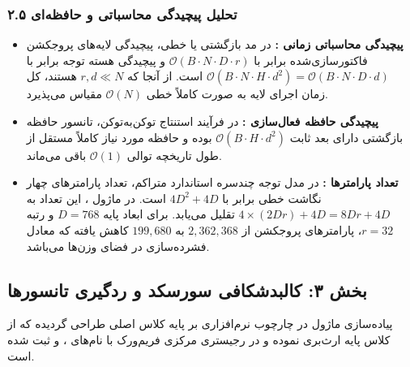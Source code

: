 \subsubsection*{۲.۵ تحلیل پیچیدگی محاسباتی و حافظه‌ای}
\begin{itemize}
    \item \textbf{پیچیدگی محاسباتی زمانی :} در مد بازگشتی یا خطی، پیچیدگی لایه‌های پروجکشن فاکتورسازی‌شده برابر با $\mathcal{O}(B \cdot N \cdot D \cdot r)$ و پیچیدگی هسته توجه برابر با $\mathcal{O}(B \cdot N \cdot H \cdot d^2) = \mathcal{O}(B \cdot N \cdot D \cdot d)$ است. از آنجا که $r, d \ll N$ هستند، کل زمان اجرای لایه به صورت کاملاً خطی $\mathcal{O}(N)$ مقیاس می‌پذیرد.
    \item \textbf{پیچیدگی حافظه فعال‌سازی :} در فرآیند استنتاج توکن‌به‌توکن، تانسور حافظه بازگشتی دارای بعد ثابت $\mathcal{O}(B \cdot H \cdot d^2)$ بوده و حافظه مورد نیاز کاملاً مستقل از طول تاریخچه توالی $\mathcal{O}(1)$ باقی می‌ماند.
    \item \textbf{تعداد پارامترها :} در مدل توجه چندسره استاندارد متراکم، تعداد پارامترهای چهار نگاشت خطی برابر با $4D^2 + 4D$ است. در ماژول ، این تعداد به $4 \times (2Dr) + 4D = 8Dr + 4D$ تقلیل می‌یابد. برای ابعاد پایه $D = 768$ و رتبه $r = 32$، پارامترهای پروجکشن از $2,362,368$ به $199,680$ کاهش یافته که معادل فشرده‌سازی  در فضای وزن‌ها می‌باشد.
\end{itemize}

\subsection*{بخش ۳: کالبدشکافی سورسکد و ردگیری تانسورها }

پیاده‌سازی ماژول  در چارچوب نرم‌افزاری بر پایه کلاس اصلی  طراحی گردیده که از کلاس پایه  ارث‌بری نموده و در رجیستری مرکزی فریم‌ورک با نام‌های ،  و  ثبت شده است.

